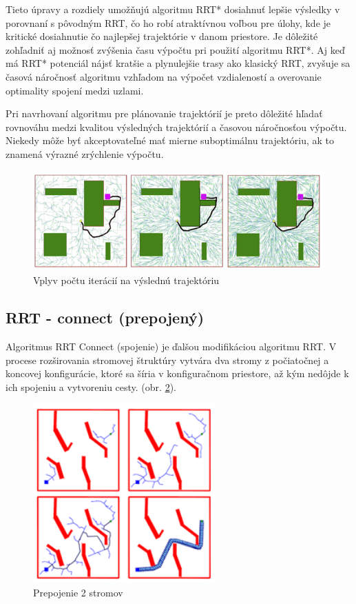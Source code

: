 Tieto úpravy a rozdiely umožňujú algoritmu RRT* dosiahnuť lepšie výsledky v porovnaní s pôvodným RRT, čo ho robí atraktívnou voľbou pre úlohy, kde je kritické dosiahnutie čo najlepšej trajektórie v danom priestore. Je dôležité zohľadniť aj možnosť zvýšenia času výpočtu pri použití algoritmu RRT*. Aj keď má RRT* potenciál nájsť kratšie a plynulejšie trasy ako klasický RRT, zvyšuje sa časová náročnosť algoritmu vzhľadom na výpočet vzdialeností a overovanie optimality spojení medzi uzlami.

Pri navrhovaní algoritmu pre plánovanie trajektórií je preto dôležité hľadať rovnováhu medzi kvalitou výsledných trajektórií a časovou náročnosťou výpočtu. Niekedy môže byť akceptovateľné mať mierne suboptimálnu trajektóriu, ak to znamená výrazné zrýchlenie výpočtu. 

\begin{figure}[h]
	\centering
	\includegraphics[width=160mm]{img/RRT2.png}
	\caption{Vplyv počtu iterácií na výslednú trajektóriu \cite{}}\label{OBRAZOK 1.2.2} 
\end{figure} 

\subsection{RRT - connect (prepojený)}
\label{kap:2.3}
Algoritmus RRT Connect (spojenie) je ďalšou modifikáciou algoritmu RRT. V procese rozširovania stromovej štruktúry vytvára dva stromy z počiatočnej a koncovej konfigurácie, ktoré sa šíria v konfiguračnom priestore, až kým nedôjde k ich spojeniu a vytvoreniu cesty. (obr. \ref{OBRAZOK 1.2.3}). 

\begin{figure}[h!]
	\centering
	\includegraphics[width=70mm]{img/RRT-connect.png}
	\caption{Prepojenie 2 stromov \cite{}}\label{OBRAZOK 1.2.3} 
\end{figure} 

